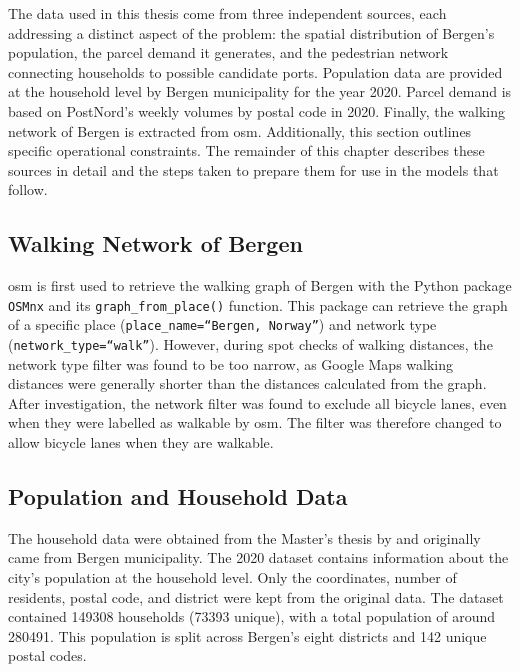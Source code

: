 \documentclass[12pt]{article}
\begin{document}
The data used in this thesis come from three independent sources, each addressing a distinct aspect of the problem: the spatial distribution of Bergen's population, the parcel demand it generates, and the pedestrian network connecting households to possible candidate ports. Population data are provided at the household level by Bergen municipality for the year 2020. Parcel demand is based on PostNord's weekly volumes by postal code in 2020. Finally, the walking network of Bergen is extracted from \ac{osm}. Additionally, this section outlines specific operational constraints. The remainder of this chapter describes these sources in detail and the steps taken to prepare them for use in the models that follow.

\subsection{Walking Network of Bergen}
\label{subsec:walking-network-bergen}

\ac{osm} is first used to retrieve the walking graph of Bergen with the Python package \texttt{OSMnx} \parencite{osmnx} and its \texttt{graph\_from\_place()} function. This package can retrieve the graph of a specific place (\texttt{place\_name=``Bergen, Norway''}) and network type (\texttt{network\_type=``walk''}). However, during spot checks of walking distances, the network type filter was found to be too narrow, as Google Maps walking distances were generally shorter than the distances calculated from the graph. After investigation, the network filter was found to exclude all bicycle lanes, even when they were labelled as walkable by \ac{osm}. The filter was therefore changed to allow bicycle lanes when they are walkable.

\subsection{Population and Household Data}
\label{subsec:population-household-data}

The household data were obtained from the Master's thesis by \cite{pop_thesis} and originally came from Bergen municipality. The 2020 dataset contains information about the city's population at the household level. Only the coordinates, number of residents, postal code, and district were kept from the original data. The dataset contained \num{149308} households (\num{73393} unique), with a total population of around \num{280491}. This population is split across Bergen's eight districts and \num{142} unique postal codes.
\end{document}
